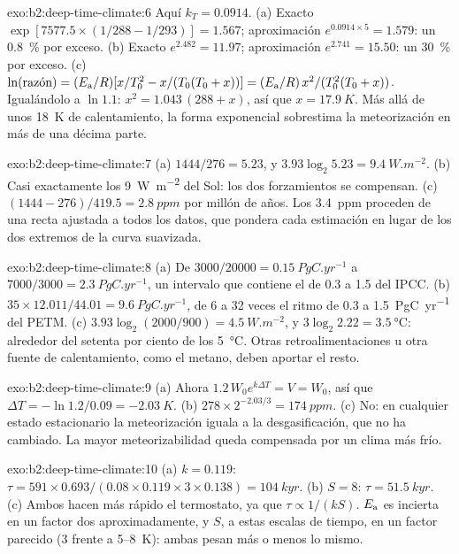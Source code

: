 \begin{solution}{exo:b2:deep-time-climate:6}
Aquí $k_T = 0.0914$. (a) Exacto $\exp[7577.5\times(1/288 - 1/293)] = 1.567$; aproximación
$e^{0.0914\times5} = 1.579$: un \qty{0.8}{\percent} por exceso. (b) Exacto $e^{2.482} = 11.97$;
aproximación $e^{2.741} = 15.50$: un \qty{30}{\percent} por exceso. (c) $\ln(\text{razón}) = (E_{\text
a}/R)[x/T_0^2 - x/(T_0(T_0 + x))] = (E_{\text a}/R)\,x^2/(T_0^2(T_0 + x))$. Igualándolo a $\ln1.1$:
$x^2 = 1.043\,(288 + x)$, así que $x = \qty{17.9}{K}$. Más allá de unos \qty{18}{K} de calentamiento, la
forma exponencial sobrestima la meteorización en más de una décima parte.
\end{solution}

\begin{solution}{exo:b2:deep-time-climate:7}
(a) $1444/276 = 5.23$, y $3.93\log_2 5.23 = \qty{9.4}{W.m^{-2}}$. (b) Casi exactamente los
\qty{9}{W.m^{-2}} del Sol: los dos forzamientos se compensan. (c) $(1444 - 276)/419.5 =
\qty{2.8}{ppm}$ por millón de años. Los \qty{3.4}{ppm} proceden de una recta ajustada a todos los
datos, que pondera cada estimación en lugar de los dos extremos de la curva suavizada.
\end{solution}

\begin{solution}{exo:b2:deep-time-climate:8}
(a) De $3000/20000 = \qty{0.15}{PgC.yr^{-1}}$ a $7000/3000 = \qty{2.3}{PgC.yr^{-1}}$, un intervalo
que contiene el de 0.3 a 1.5 del IPCC. (b) $35\times12.011/44.01 = \qty{9.6}{PgC.yr^{-1}}$, de 6 a
32 veces el ritmo de 0.3 a \qty{1.5}{PgC.yr^{-1}} del PETM. (c) $3.93\log_2(2000/900) = \qty{4.5}{W.m^{-2}}$,
y $3\log_2 2.22 = \qty{3.5}{\celsius}$: alrededor del setenta por ciento de los \qty{5}{\celsius}. Otras
retroalimentaciones u otra fuente de calentamiento, como el metano, deben aportar el resto.
\end{solution}

\begin{solution}{exo:b2:deep-time-climate:9}
(a) Ahora $1.2\,W_0e^{k\Delta T} = V = W_0$, así que $\Delta T = -\ln 1.2/0.09 = \qty{-2.03}{K}$.
(b) $278\times2^{-2.03/3} = \qty{174}{ppm}$. (c) No: en cualquier estado estacionario la meteorización iguala a la
desgasificación, que no ha cambiado. La mayor meteorizabilidad queda compensada por un clima más frío.
\end{solution}

\begin{solution}{exo:b2:deep-time-climate:10}
(a) $k = 0.119$: $\tau = 591\times0.693/(0.08\times0.119\times3\times0.138) = \qty{104}{kyr}$.
(b) $S = 8$: $\tau = \qty{51.5}{kyr}$. (c) Ambos hacen más rápido el termostato, ya que $\tau \propto
1/(kS)$. $E_{\text a}$ es incierta en un factor dos aproximadamente, y $S$, a estas escalas de tiempo, en un
factor parecido (3 frente a 5--\qty{8}{K}): ambas pesan más o menos lo mismo.
\end{solution}

